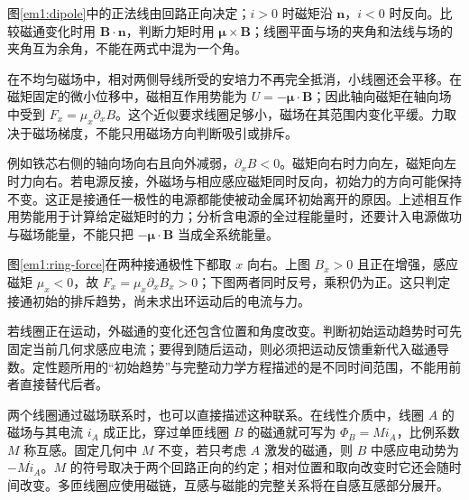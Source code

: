 图\ref{em1:dipole}中的正法线由回路正向决定；$i>0$ 时磁矩沿 $\bm n$，$i<0$ 时反向。比较磁通变化时用 $\bm B\cdot\bm n$，判断力矩时用 $\bm\mu\times\bm B$；线圈平面与场的夹角和法线与场的夹角互为余角，不能在两式中混为一个角。



在不均匀磁场中，相对两侧导线所受的安培力不再完全抵消，小线圈还会平移。在磁矩固定的微小位移中，磁相互作用势能为 $U=-\bm\mu\cdot\bm B$；因此轴向磁矩在轴向场中受到 $F_x=\mu_x\partial_xB$。这个近似要求线圈足够小，磁场在其范围内变化平缓。力取决于磁场梯度，不能只用磁场方向判断吸引或排斥。


例如铁芯右侧的轴向场向右且向外减弱，$\partial_xB<0$。磁矩向右时力向左，磁矩向左时力向右。若电源反接，外磁场与相应感应磁矩同时反向，初始力的方向可能保持不变。这正是接通任一极性的电源都能使被动金属环初始离开的原因。上述相互作用势能用于计算给定磁矩时的力；分析含电源的全过程能量时，还要计入电源做功与磁场能量，不能只把 $-\bm\mu\cdot\bm B$ 当成全系统能量。


图\ref{em1:ring-force}在两种接通极性下都取 $x$ 向右。上图 $B_x>0$ 且正在增强，感应磁矩 $\mu_x<0$，故 $F_x=\mu_x\partial_xB_x>0$；下图两者同时反号，乘积仍为正。这只判定接通初始的排斥趋势，尚未求出环运动后的电流与力。



若线圈正在运动，外磁通的变化还包含位置和角度改变。判断初始运动趋势时可先固定当前几何求感应电流；要得到随后运动，则必须把运动反馈重新代入磁通导数。定性题所用的“初始趋势”与完整动力学方程描述的是不同时间范围，不能用前者直接替代后者。


两个线圈通过磁场联系时，也可以直接描述这种联系。在线性介质中，线圈 $A$ 的磁场与其电流 $i_A$ 成正比，穿过单匝线圈 $B$ 的磁通就可写为 $\Phi_B=Mi_A$，比例系数 $M$ 称互感。固定几何中 $M$ 不变，若只考虑 $A$ 激发的磁通，则 $B$ 中感应电动势为 $-M\dot i_A$。$M$ 的符号取决于两个回路正向的约定；相对位置和取向改变时它还会随时间改变。多匝线圈应使用磁链，互感与磁能的完整关系将在自感互感部分展开。


